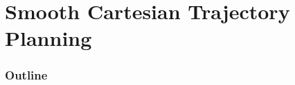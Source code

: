 \documentclass[10pt, aspectratio=169]{beamer}
\theoremstyle{remark}
\theoremstyle{definition}
\begin{document}
\section{Smooth Cartesian Trajectory Planning}
\begin{frame}
	\frametitle{Outline} %
\end{frame}
\end{document}
